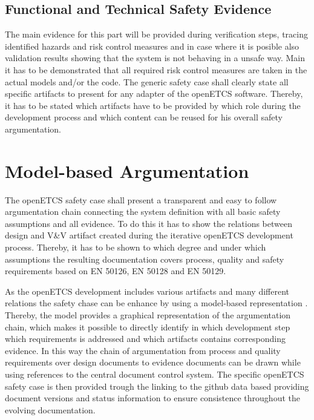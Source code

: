 \documentclass{template/openetcs_report}
\begin{document}
\subsection{Functional and Technical Safety Evidence}

The main evidence for this part will be provided during verification steps, tracing identified hazards and risk control measures and in case where it is posible also validation results showing that the system is not behaving in a unsafe way. Main it has to be demonstrated that all required risk control measures are taken in the actual models and/or the code. The generic safety case shall clearly state all specific artifacts to present for any adapter of the openETCS software. Thereby, it has to be stated which artifacts have to be provided by which role during the development process and which content can be reused for his overall safety argumentation.

\section{Model-based Argumentation}
\label{sec:safetycase-model}

The openETCS safety case shall present a transparent and easy to follow argumentation chain connecting the system definition with all basic safety assumptions and all evidence. To do this it has to show the relations between design and V\&V artifact created during the iterative openETCS development process. Thereby, it has to be shown to which degree and under which assumptions the resulting documentation covers process, quality and safety requirements based on EN 50126, EN 50128 and EN 50129.

As the openETCS development includes various artifacts and many different relations the safety chase can be enhance by using a model-based representation \cite{Muller.2010}.  Thereby, the model provides a graphical representation of the argumentation chain, which makes it possible to directly identify in which development step which requirements is addressed and which artifacts contains corresponding evidence.  In this way the chain of argumentation from process and quality requirements over design documents to evidence documents can be drawn while using references to the central document control system. The specific openETCS safety case is then provided trough the linking to the github data based providing document versions and status information to ensure consistence throughout the evolving documentation.
\end{document}
